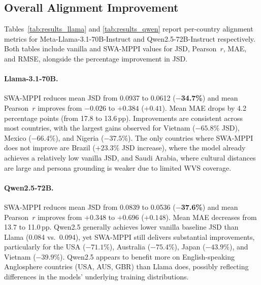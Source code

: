 \documentclass{article}
\begin{document}
\subsection{Overall Alignment Improvement}
\label{sec:results:overall}

Tables~\ref{tab:results_llama} and \ref{tab:results_qwen} report per-country
alignment metrics for Meta-Llama-3.1-70B-Instruct and Qwen2.5-72B-Instruct
respectively. Both tables include vanilla and SWA-MPPI values for JSD, Pearson~$r$,
MAE, and RMSE, alongside the percentage improvement in JSD.

\paragraph{Llama-3.1-70B.}
SWA-MPPI reduces mean JSD from 0.0937 to 0.0612 (\textbf{$-$34.7\%}) and mean
Pearson~$r$ improves from $-0.026$ to $+0.384$ ($+0.41$). Mean MAE drops by 4.2
percentage points (from 17.8 to 13.6\,pp). Improvements are consistent across
most countries, with the largest gains observed for Vietnam ($-65.8\%$ JSD),
Mexico ($-66.4\%$), and Nigeria ($-37.5\%$). The only countries where SWA-MPPI
does not improve are Brazil ($+23.3\%$ JSD increase), where the model already
achieves a relatively low vanilla JSD, and Saudi Arabia, where cultural distances
are large and persona grounding is weaker due to limited WVS coverage.

\paragraph{Qwen2.5-72B.}
SWA-MPPI reduces mean JSD from 0.0839 to 0.0536 (\textbf{$-$37.6\%}) and mean
Pearson~$r$ improves from $+0.348$ to $+0.696$ ($+0.148$). Mean MAE decreases
from 13.7 to 11.0\,pp. Qwen2.5 generally achieves lower vanilla baseline JSD than
Llama (0.084 vs.\ 0.094), yet SWA-MPPI still delivers substantial improvements,
particularly for the USA ($-71.1\%$), Australia ($-75.4\%$), Japan ($-43.9\%$),
and Vietnam ($-39.9\%$). Qwen2.5 appears to benefit more on English-speaking
Anglosphere countries (USA, AUS, GBR) than Llama does, possibly reflecting
differences in the models' underlying training distributions.
\end{document}
